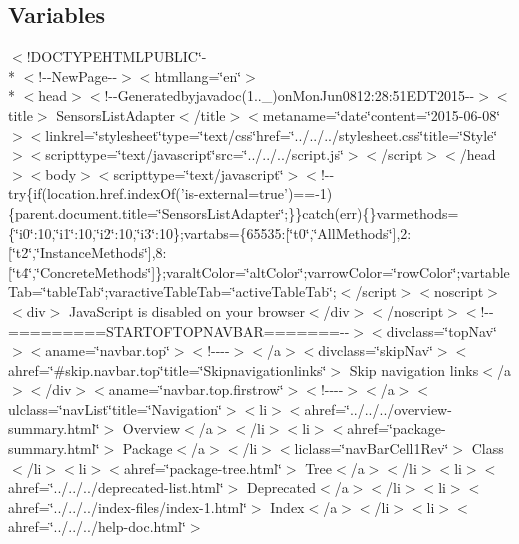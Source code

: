 \subsection*{Variables}
\begin{DoxyCompactItemize}
\item 
$<$!D\-O\-C\-T\-Y\-P\-E\-H\-T\-M\-L\-P\-U\-B\-L\-I\-C\char`\"{}-\/\\*
$<$!-\/-\/New\-Page-\/-\/$>$$<$htmllang=\char`\"{}en\char`\"{}$>$\\*
$<$head$>$$<$!-\/-\/Generatedbyjavadoc(1..\-\_)on\-Mon\-Jun0812\-:28\-:51\-E\-D\-T2015-\/-\/$>$$<$title$>$ Sensors\-List\-Adapter$<$/title$>$$<$metaname=\char`\"{}date\char`\"{}content=\char`\"{}2015-\/06-\/08\char`\"{}$>$$<$linkrel=\char`\"{}stylesheet\char`\"{}type=\char`\"{}text/css\char`\"{}href=\char`\"{}../../../stylesheet.\-css\char`\"{}title=\char`\"{}\-Style\char`\"{}$>$$<$scripttype=\char`\"{}text/javascript\char`\"{}src=\char`\"{}../../../script.\-js\char`\"{}$>$$<$/script$>$$<$/head$>$$<$body$>$$<$scripttype=\char`\"{}text/javascript\char`\"{}$>$$<$!-\/-\/try\{if(location.\-href.\-index\-Of('is-\/external=true')==-\/1)\{parent.\-document.\-title=\char`\"{}\-Sensors\-List\-Adapter\char`\"{};\}\}catch(err)\{\}varmethods=\{\char`\"{}i0\char`\"{}\-:10,\char`\"{}i1\char`\"{}\-:10,\char`\"{}i2\char`\"{}\-:10,\char`\"{}i3\char`\"{}\-:10\};vartabs=\{65535\-:\mbox{[}\char`\"{}t0\char`\"{},\char`\"{}\-All\-Methods\char`\"{}\mbox{]},2\-:\mbox{[}\char`\"{}t2\char`\"{},\char`\"{}\-Instance\-Methods\char`\"{}\mbox{]},8\-:\mbox{[}\char`\"{}t4\char`\"{},\char`\"{}\-Concrete\-Methods\char`\"{}\mbox{]}\};varalt\-Color=\char`\"{}alt\-Color\char`\"{};varrow\-Color=\char`\"{}row\-Color\char`\"{};vartable\-Tab=\char`\"{}table\-Tab\char`\"{};varactive\-Table\-Tab=\char`\"{}active\-Table\-Tab\char`\"{};$<$/script$>$$<$noscript$>$$<$div$>$ Java\-Script is disabled on your browser$<$/div$>$$<$/noscript$>$$<$!-\/-\/=========\-S\-T\-A\-R\-T\-O\-F\-T\-O\-P\-N\-A\-V\-B\-A\-R=======-\/-\/$>$$<$divclass=\char`\"{}top\-Nav\char`\"{}$>$$<$aname=\char`\"{}navbar.\-top\char`\"{}$>$$<$!-\/-\/-\/-\/$>$$<$/a$>$$<$divclass=\char`\"{}skip\-Nav\char`\"{}$>$$<$ahref=\char`\"{}\#skip.\-navbar.\-top\char`\"{}title=\char`\"{}\-Skipnavigationlinks\char`\"{}$>$ Skip navigation links$<$/a$>$$<$/div$>$$<$aname=\char`\"{}navbar.\-top.\-firstrow\char`\"{}$>$$<$!-\/-\/-\/-\/$>$$<$/a$>$$<$ulclass=\char`\"{}nav\-List\char`\"{}title=\char`\"{}\-Navigation\char`\"{}$>$$<$li$>$$<$ahref=\char`\"{}../../../overview-\/summary.\-html\char`\"{}$>$ Overview$<$/a$>$$<$/li$>$$<$li$>$$<$ahref=\char`\"{}package-\/summary.\-html\char`\"{}$>$ Package$<$/a$>$$<$/li$>$$<$liclass=\char`\"{}nav\-Bar\-Cell1\-Rev\char`\"{}$>$ Class$<$/li$>$$<$li$>$$<$ahref=\char`\"{}package-\/tree.\-html\char`\"{}$>$ Tree$<$/a$>$$<$/li$>$$<$li$>$$<$ahref=\char`\"{}../../../deprecated-\/list.\-html\char`\"{}$>$ Deprecated$<$/a$>$$<$/li$>$$<$li$>$$<$ahref=\char`\"{}../../../index-\/files/index-\/1.\-html\char`\"{}$>$ Index$<$/a$>$$<$/li$>$$<$li$>$$<$ahref=\char`\"{}../../../help-\/doc.\-html\char`\"{}$>$ $$
\end{DoxyCompactItemize}
